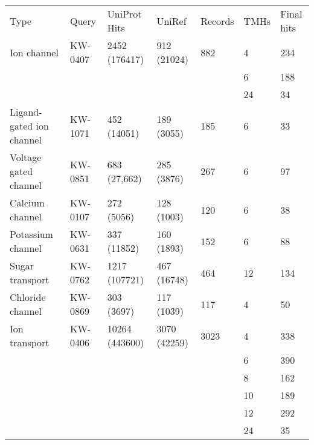 \begin{table}[htbp]
\begin{tabular}{lllllll}
Type                     & Query & UniProt Hits   & UniRef &  Records & TMHs & Final hits \\
Ion channel              & KW-0407            & 2452 (176417)  & 912 (21024)            & 882                & 4    & 234        \\
                         &                    &                &                        &                    & 6    & 188        \\
                         &                    &                &                        &                    & 24   & 34         \\
Ligand-gated ion channel & KW-1071            & 452 (14051)    & 189 (3055)             & 185                & 6    & 33         \\
Voltage gated channel    & KW-0851            & 683 (27,662)   & 285 (3876)             & 267                & 6    & 97         \\
Calcium channel          & KW-0107            & 272 (5056)     & 128 (1003)             & 120                & 6    & 38         \\
Potassium channel        & KW-0631            & 337 (11852)    & 160 (1893)             & 152                & 6    & 88         \\
Sugar transport          & KW-0762            & 1217 (107721)  & 467 (16748)            & 464                & 12   & 134        \\
Chloride channel         & KW-0869            & 303 (3697)     & 117 (1039)             & 117                & 4    & 50         \\
Ion transport            & KW-0406            & 10264 (443600) & 3070 (42259)           & 3023               & 4    & 338        \\
                         &                    &                &                        &                    & 6    & 390        \\
                         &                    &                &                        &                    & 8    & 162        \\
                         &                    &                &                        &                    & 10   & 189        \\
                         &                    &                &                        &                    & 12   & 292        \\
                         &                    &                &                        &                    & 24   & 35
\end{tabular}
\label{table:datasetsizes}
\end{table}


